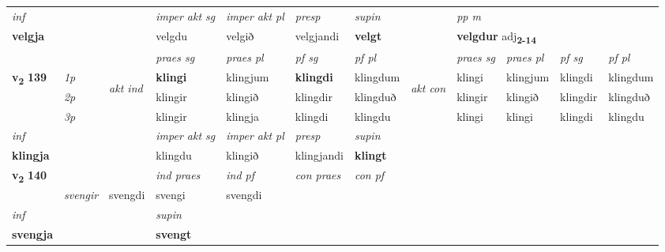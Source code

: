 \begin{longtable}[l]{X>{\footnotesize\itshape}llXXXXlXXXX}
\cmidrule{4-7}
   {\textit{inf}} & &  & \textit{imper akt sg} & \textit{imper akt pl}   & \textit{presp} & \textit{supin}  && \textit{pp m} \\*
  {\textbf{velgja}} & && velgdu  & velgið   & velgjandi &  \textbf{velgt}  && \multicolumn{2}{l}{\textbf{velgdur} adj\textbf{\textsubscript{2-14}}} \\*

\midrule

 & &   & \textit{praes sg}  & \textit{praes pl}    & \textit{ pf sg} & \textit{pf pl} & & \textit{praes sg}  & \textit{praes pl}    & \textit{pf sg} & \textit{pf pl }  \\ \cmidrule{4-7} \cmidrule{9-12}
 \multirow{2}{*}{{{\textbf{v{\textsubscript{2}}} \Large{\textbf{139}}}}}  & 1p & \multirow{3}{*}{\begin{turn}{90}\textit{akt ind}\end{turn}} & \textbf{klingi} & klingjum & \textbf{klingdi} & klingdum & \multirow{3}{*}{\begin{turn}{90}\textit{akt con}\end{turn}} &klingi & klingjum & klingdi & klingdum\\*
 & 2p &  &  klingir  & klingið & klingdir & klingduð & & klingir & klingið & klingdir & klingduð \\*
 & 3p &  & klingir & klingja & klingdi & klingdu & & klingi & klingi& klingdi & klingdu \\*
\cmidrule{4-7} \cmidrule{9-12}

   {\textit{inf}} & &  & \textit{imper akt sg} & \textit{imper akt pl}   & \textit{presp} & \textit{supin}   \\*
  {\textbf{klingja}} & && klingdu  & klingið   & klingjandi &  \textbf{klingt}   \\*

\midrule

\multirow{2}{*}{{{\textbf{v{\textsubscript{2}}} \Large{\textbf{140}}}}}  &&&  \textit{ind praes} & \textit{ind pf} & \textit{con praes} & \textit{con pf} \\*
\multicolumn{3}{r}{\textit{e-n}} & svengir & svengdi & svengi & svengdi \\*

\cmidrule{4-7}
   {\textit{inf}} & &      & \textit{supin}   \\*
  {\textbf{svengja}} & &      &  \textbf{svengt}   \\*

\midrule


\end{longtable}
